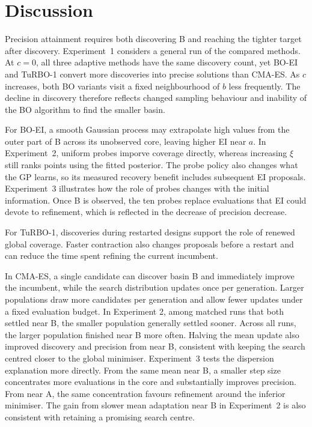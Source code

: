 \section{Discussion}\label{sec:discussion}

Precision attainment requires both discovering B and reaching the tighter target after discovery. Experiment~1 considers a general run of the compared methods. At \(c=0\), all three adaptive methods have the same discovery count, yet BO-EI and TuRBO-1 convert more discoveries into precise solutions than CMA-ES. As \(c\) increases, both BO variants visit a fixed neighbourhood of \(b\) less frequently. The decline in discovery therefore reflects changed sampling behaviour and inability of the BO algorithm to find the smaller basin.

For BO-EI, a smooth Gaussian process may extrapolate high values from the outer part of B across its unobserved core, leaving higher EI near \(a\).  In Experiment~2, uniform probes imporve coverage directly, whereas increasing \(\xi\) still ranks points using the fitted posterior. The probe policy also changes what the GP learns, so its measured recovery benefit includes subsequent EI proposals. Experiment~3 illustrates how the role of probes changes with the initial information. Once B is observed, the ten probes replace evaluations that EI could devote to refinement, which is reflected in the decrease of precision decrease.

For TuRBO-1, discoveries during restarted designs support the role of renewed global coverage. Faster contraction also changes proposals before a restart and can reduce the time spent refining the current incumbent. 

In CMA-ES, a single candidate can discover basin B and immediately improve the incumbent, while the search distribution updates once per generation. Larger populations draw more candidates per generation and allow fewer updates under a fixed evaluation budget. In Experiment 2, among matched runs that both settled near B, the smaller population generally settled sooner. Across all runs, the larger population finished near B more often. Halving the mean update also improved discovery and precision from near B, consistent with keeping the search centred closer to the global minimiser.  Experiment~3 tests the dispersion explanation more directly. From the same mean near B, a smaller step size concentrates more evaluations in the core and substantially improves precision. From near A, the same concentration favours refinement around the inferior minimiser. The gain from slower mean adaptation near B in Experiment~2 is also consistent with retaining a promising search centre.
